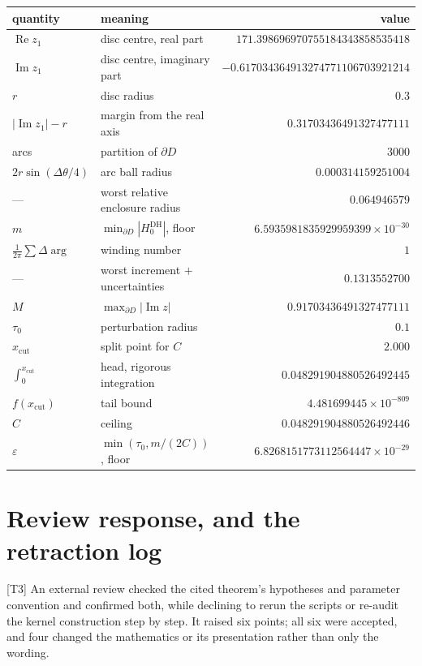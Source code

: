 \documentclass[11pt,a4paper]{article}
\theoremstyle{remark}
\newcommand{\tier}[1]{{\small\textsf{[#1]}}}
\newcommand{\HDH}{H^{\mathrm{DH}}}
\begin{document}
\begin{center}
\begin{tabular}{@{}llr@{}}
\toprule
quantity & meaning & value \\
\midrule
$\operatorname{Re}z_1$ & disc centre, real part & $171.398696970755184343858535418$ \\
$\operatorname{Im}z_1$ & disc centre, imaginary part & $-0.617034364913274771106703921214$ \\
$r$ & disc radius & $0.3$ \\
$|\operatorname{Im}z_1|-r$ & margin from the real axis & $0.31703436491327477111$ \\
arcs & partition of $\partial D$ & $3000$ \\
$2r\sin(\Delta\theta/4)$ & arc ball radius & $0.000314159251004$ \\
--- & worst relative enclosure radius & $0.064946579$ \\
$m$ & $\min_{\partial D}|\HDH_0|$, floor & $6.5935981835929959399\times10^{-30}$ \\
$\frac{1}{2\pi}\sum\Delta\arg$ & winding number & $1$ \\
--- & worst increment $+$ uncertainties & $0.1313552700$ \\
$M$ & $\max_{\partial D}|\operatorname{Im}z|$ & $0.91703436491327477111$ \\
$\tau_0$ & perturbation radius & $0.1$ \\
$x_{\mathrm{cut}}$ & split point for $C$ & $2.000$ \\
$\int_0^{x_{\mathrm{cut}}}$ & head, rigorous integration & $0.048291904880526492445$ \\
$f(x_{\mathrm{cut}})$ & tail bound & $4.481699445\times10^{-809}$ \\
$C$ & ceiling & $0.048291904880526492446$ \\
$\varepsilon$ & $\min(\tau_0,m/(2C))$, floor & $6.8268151773112564447\times10^{-29}$ \\
\bottomrule
\end{tabular}
\end{center}

\section{Review response, and the retraction log}\label{app:retr}\label{app:review}

\tier{T3} An external review checked the cited theorem's hypotheses and parameter
convention and confirmed both, while declining to rerun the scripts or re-audit the kernel
construction step by step. It raised six points; all six were accepted, and four changed the
mathematics or its presentation rather than only the wording.
\end{document}
